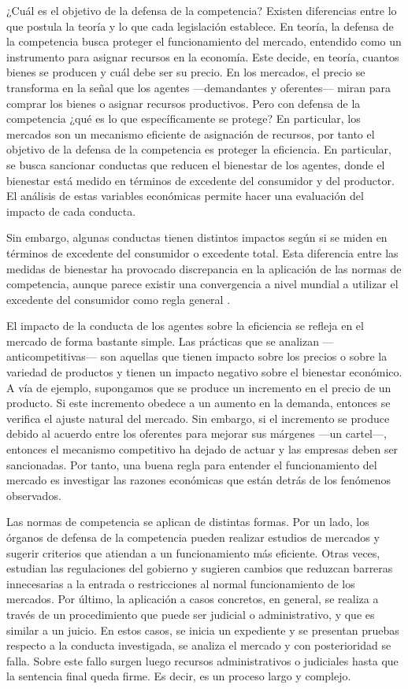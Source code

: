\documentclass[
  12pt,
  spanish,
]{book}
\begin{document}
¿Cuál es el objetivo de la defensa de la competencia? Existen
diferencias entre lo que postula la teoría y lo que cada legislación
establece. En teoría, la defensa de la competencia busca proteger el
funcionamiento del mercado, entendido como un instrumento para asignar
recursos en la economía. Este decide, en teoría, cuantos bienes se
producen y cuál debe ser su precio. En los mercados, el precio se
transforma en la señal que los agentes ---demandantes y oferentes---
miran para comprar los bienes o asignar recursos productivos. Pero con
defensa de la competencia ¿qué es lo que específicamente se protege? En
particular, los mercados son un mecanismo eficiente de asignación de
recursos, por tanto el objetivo de la defensa de la competencia es
proteger la eficiencia. En particular, se busca sancionar conductas que
reducen el bienestar de los agentes, donde el bienestar está medido en
términos de excedente del consumidor y del productor. El análisis de
estas variables económicas permite hacer una evaluación del impacto de
cada conducta.

Sin embargo, algunas conductas tienen distintos impactos según si se
miden en términos de excedente del consumidor o excedente total. Esta
diferencia entre las medidas de bienestar ha provocado discrepancia en
la aplicación de las normas de competencia, aunque parece existir una
convergencia a nivel mundial a utilizar el excedente del consumidor como
regla general \citep[capítulo 2]{Motta2004}.

El impacto de la conducta de los agentes sobre la eficiencia se refleja
en el mercado de forma bastante simple. Las prácticas que se analizan
---anticompetitivas--- son aquellas que tienen impacto sobre los precios
o sobre la variedad de productos y tienen un impacto negativo sobre el
bienestar económico. A vía de ejemplo, supongamos que se produce un
incremento en el precio de un producto. Si este incremento obedece a un
aumento en la demanda, entonces se verifica el ajuste natural del
mercado. Sin embargo, si el incremento se produce debido al acuerdo
entre los oferentes para mejorar sus márgenes ---un cartel---, entonces
el mecanismo competitivo ha dejado de actuar y las empresas deben ser
sancionadas. Por tanto, una buena regla para entender el funcionamiento
del mercado es investigar las razones económicas que están detrás de los
fenómenos observados.

Las normas de competencia se aplican de distintas formas. Por un lado,
los órganos de defensa de la competencia pueden realizar estudios de
mercados y sugerir criterios que atiendan a un funcionamiento más
eficiente. Otras veces, estudian las regulaciones del gobierno y
sugieren cambios que reduzcan barreras innecesarias a la entrada o
restricciones al normal funcionamiento de los mercados. Por último, la
aplicación a casos concretos, en general, se realiza a través de un
procedimiento que puede ser judicial o administrativo, y que es similar
a un juicio. En estos casos, se inicia un expediente y se presentan
pruebas respecto a la conducta investigada, se analiza el mercado y con
posterioridad se falla. Sobre este fallo surgen luego recursos
administrativos o judiciales hasta que la sentencia final queda firme.
Es decir, es un proceso largo y complejo.
\end{document}
